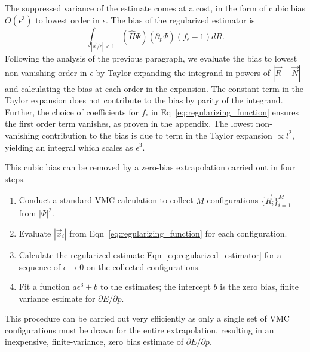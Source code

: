 \documentclass[twocolumn]{revtex4-1}
\begin{document}
The suppressed variance of the estimate comes at a cost, in the form of cubic bias $O(\epsilon^3)$ to lowest order in $\epsilon$.
The bias of the regularized estimator is
\begin{equation}
\int_{|\vec{x}/\epsilon|< 1} (\hat{H}\Psi) (\partial_p \Psi) (f_\epsilon - 1) dR.
\label{eq:estimator_bias}
\end{equation}
Following the analysis of the previous paragraph, we evaluate the bias to lowest non-vanishing order in $\epsilon$ by Taylor expanding the integrand in powers of $|\vec{R} - \vec{N}|$ and calculating the bias at each order in the expansion.
The constant term in the Taylor expansion does not contribute to the bias by parity of the integrand.
Further, the choice of coefficients for $f_\epsilon$ in Eq~\ref{eq:regularizing_function} ensures the first order term vanishes, as proven in the appendix.
The lowest non-vanishing contribution to the bias is due to term in the Taylor expansion $\propto l^2$, yielding an integral which scales as $\epsilon^3$.

This cubic bias can be removed by a zero-bias extrapolation carried out in four steps.
\begin{enumerate}
\item Conduct a standard VMC calculation to collect $M$ configurations $\{\vec{R}_i\}_{i=1}^M$ from $|\Psi|^2$.
\item Evaluate $|\vec{x}_i|$ from Eqn~\ref{eq:regularizing_function} for each configuration.
\item Calculate the regularized estimate Eqn~\ref{eq:regularized_estimator} for a sequence of $\epsilon \rightarrow 0$ on the collected configurations.
\item Fit a function $a\epsilon^3 + b$ to the estimates; the intercept $b$ is the zero bias, finite variance estimate for $\partial E/\partial p$.
\end{enumerate}
This procedure can be carried out very efficiently as only a single set of VMC configurations must be drawn for the entire extrapolation, resulting in an inexpensive, finite-variance, zero bias estimate of $\partial E/\partial p$.
\end{document}
